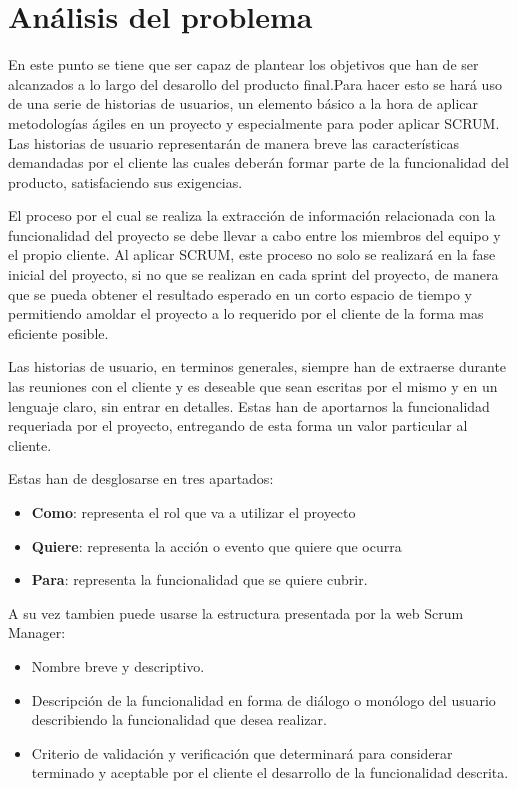 \chapter{Análisis del problema}
 
En este punto se tiene que ser capaz de plantear los objetivos que han de ser alcanzados a lo largo del desarollo del producto final.Para hacer esto se hará uso de una serie de historias de usuarios, un elemento básico a la hora de aplicar metodologías ágiles en un proyecto y especialmente para poder aplicar SCRUM. Las historias de usuario representarán de manera breve las características demandadas por el cliente las cuales deberán formar parte de la funcionalidad del producto, satisfaciendo sus exigencias.

El proceso por el cual se realiza la extracción de información relacionada con la funcionalidad del proyecto se debe llevar a cabo entre los miembros del equipo y el propio cliente. Al aplicar SCRUM, este proceso no solo se realizará en la fase inicial del proyecto, si no que se realizan en cada sprint del proyecto, de manera que se pueda obtener el resultado esperado en un corto espacio de tiempo y permitiendo amoldar el proyecto a lo requerido por el cliente de la forma mas eficiente posible.

Las historias de usuario, en terminos generales, siempre han de extraerse durante las reuniones con el cliente y es deseable que sean escritas por el mismo y en un lenguaje claro, sin entrar en detalles. Estas han de aportarnos la funcionalidad requeriada por el proyecto, entregando de esta forma un valor particular al cliente.

Estas han de desglosarse en tres apartados:
\begin{itemize}
	\item \textbf{Como}: representa el rol que va a utilizar el proyecto
	\item \textbf{Quiere}: representa la acción o evento que quiere que ocurra
	\item \textbf{Para}: representa la funcionalidad que se quiere cubrir.
\end{itemize}

\newpage
A su vez tambien puede usarse la estructura presentada por la web Scrum Manager\cite{scrum-manager}:
\begin{itemize}
	\item Nombre breve y descriptivo.
	\item Descripción de la funcionalidad en forma de diálogo o monólogo del usuario describiendo la funcionalidad que desea realizar.
	\item Criterio de validación y verificación que determinará para considerar terminado y aceptable por el cliente el desarrollo de la funcionalidad descrita.
\end{itemize}

